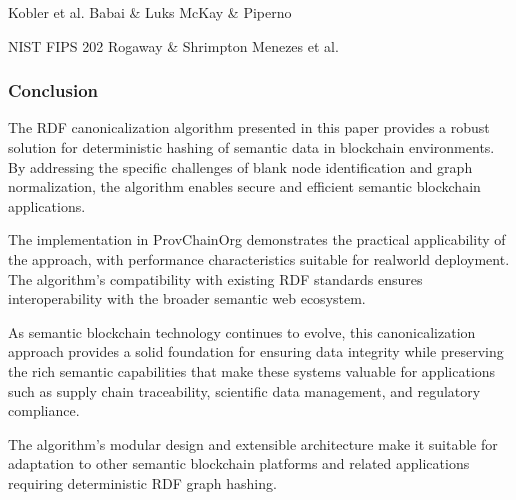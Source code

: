 \documentclass[letterpaper,10pt,english]{sphinxmanual}
\begin{document}
\sphinxAtStartPar
{}
\sphinxhyphen{}  \sphinxhyphen{} Kobler et al.
\sphinxhyphen{}  \sphinxhyphen{} Babai \& Luks
\sphinxhyphen{}  \sphinxhyphen{} McKay \& Piperno

\sphinxAtStartPar
{}
\sphinxhyphen{}  \sphinxhyphen{} NIST FIPS 202
\sphinxhyphen{}  \sphinxhyphen{} Rogaway \& Shrimpton
\sphinxhyphen{}  \sphinxhyphen{} Menezes et al.


\subsubsection{Conclusion}
\label{\detokenize{research/rdf-canonicalization-algorithm:conclusion}}
\sphinxAtStartPar
The RDF canonicalization algorithm presented in this paper provides a robust solution for deterministic hashing of semantic data in blockchain environments. By addressing the specific challenges of blank node identification and graph normalization, the algorithm enables secure and efficient semantic blockchain applications.

\sphinxAtStartPar
The implementation in ProvChainOrg demonstrates the practical applicability of the approach, with performance characteristics suitable for real\sphinxhyphen{}world deployment. The algorithm’s compatibility with existing RDF standards ensures interoperability with the broader semantic web ecosystem.

\sphinxAtStartPar
As semantic blockchain technology continues to evolve, this canonicalization approach provides a solid foundation for ensuring data integrity while preserving the rich semantic capabilities that make these systems valuable for applications such as supply chain traceability, scientific data management, and regulatory compliance.

\sphinxAtStartPar
The algorithm’s modular design and extensible architecture make it suitable for adaptation to other semantic blockchain platforms and related applications requiring deterministic RDF graph hashing.
\end{document}
